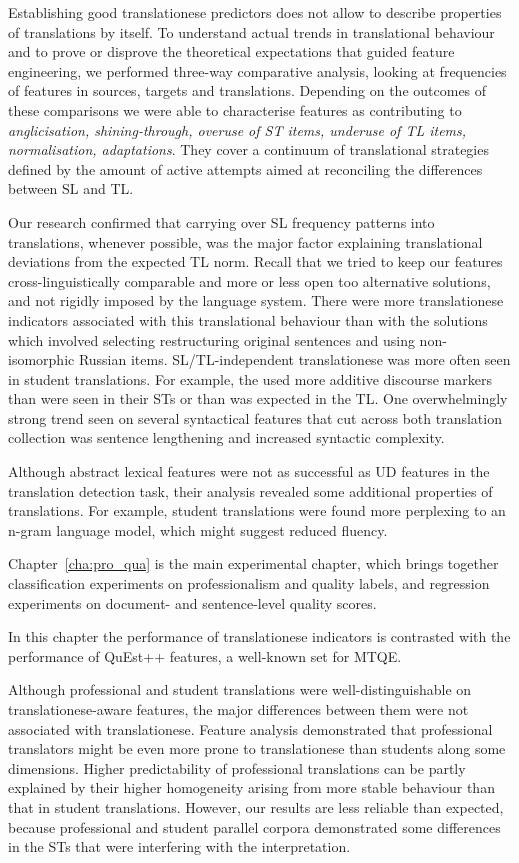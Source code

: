 Establishing good translationese predictors does not allow to describe properties of translations by itself. To understand actual trends in translational behaviour and to prove or disprove the theoretical expectations that guided feature engineering, we performed three-way comparative analysis, looking at frequencies of features in sources, targets and translations. 
Depending on the outcomes of these comparisons we were able to characterise features as contributing to \textit{anglicisation, shining-through, overuse of ST items, underuse of TL items, normalisation, adaptations}. They cover a continuum of translational strategies defined by the amount of active attempts aimed at reconciling the differences between SL and TL.

Our research confirmed that carrying over SL frequency patterns into translations, whenever possible, was the major factor explaining translational deviations from the expected TL norm. Recall that we tried to keep our features cross-linguistically comparable and more or less open too alternative solutions, and not rigidly imposed by the language system. There were more translationese indicators associated with this translational behaviour than with the solutions which involved selecting restructuring original sentences and using non-isomorphic Russian items. 
SL/TL-independent translationese was more often seen in student translations. For example, the used more additive discourse markers than were seen in their STs or than was expected in the TL. 
One overwhelmingly strong trend seen on several syntactical features that cut across both translation collection was sentence lengthening and increased syntactic complexity.

Although abstract lexical features were not as successful as UD features in the translation detection task, their analysis revealed some additional properties of translations. For example, student translations were found more perplexing to an n-gram language model, which might suggest reduced fluency. 

Chapter~\ref{cha:pro_qua} is the main experimental chapter, which brings together classification experiments on professionalism and quality labels, and regression experiments on document- and sentence-level quality scores. 

In this chapter the performance of translationese indicators is contrasted with the performance of QuEst++ features, a well-known set for MTQE. 

Although professional and student translations were well-distinguishable on translationese-aware features, the major differences between them were not associated with translationese. Feature analysis demonstrated that professional translators might be even more prone to translationese than students along some dimensions. Higher predictability of professional translations can be partly explained by their higher homogeneity arising from more stable behaviour than that in student translations.
However, our results are less reliable than expected, because professional and student parallel corpora demonstrated some differences in the STs that were interfering with the interpretation. 

